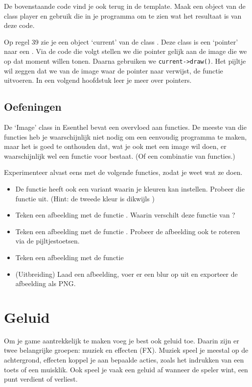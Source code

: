 \begin{exercise}
De bovenstaande code vind je ook terug in de template. Maak een object van de class player en gebruik die in je programma om te zien wat het resultaat is van deze code.
\end{exercise}

\begin{note}
Op regel 39 zie je een object `current' van de class . Deze class is een `pointer' naar een . Via de code die volgt stellen we die pointer gelijk aan de image die we op dat moment willen tonen. Daarna gebruiken we \verb|current->draw()|. Het pijltje wil zeggen dat we van de image waar de pointer naar verwijst, de functie  uitvoeren. In een volgend hoofdstuk leer je meer over pointers.
\end{note}

\subsection{Oefeningen}
De `Image' class in Esenthel bevat een overvloed aan functies. De meeste van die functies heb je waarschijnlijk niet nodig om een eenvoudig programma te maken, maar het is goed te onthouden dat, wat je ook met een image wil doen, er waarschijnlijk wel een functie voor bestaat. (Of een combinatie van functies.)

Experimenteer alvast eens met de volgende functies, zodat je weet wat ze doen.

\begin{itemize}
\item De functie  heeft ook een variant waarin je kleuren kan instellen. Probeer die functie uit. (Hint: de tweede kleur is dikwijls )
\item Teken een afbeelding met de functie . Waarin verschilt deze functie van ?
\item Teken een afbeelding met de functie . Probeer de afbeelding ook te roteren via de pijltjestoetsen.
\item Teken een afbeelding met de functie 
\item (Uitbreiding) Laad een afbeelding, voer er een blur op uit en exporteer de afbeelding als PNG.
\end{itemize}

\section{Geluid}
Om je game aantrekkelijk te maken voeg je best ook geluid toe. Daarin zijn er twee belangrijke groepen: muziek en effecten (FX). Muziek speel je meestal op de achtergrond, effecten koppel je aan bepaalde acties, zoals het indrukken van een toets of een muisklik. Ook speel je vaak een geluid af wanneer de speler wint, een punt verdient of verliest.

